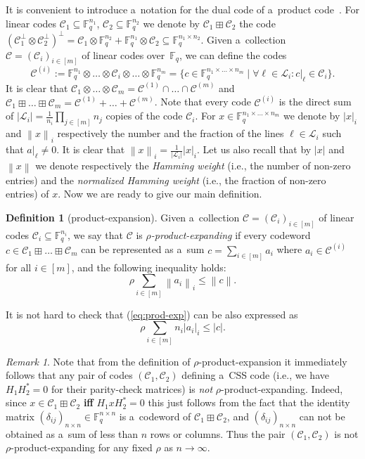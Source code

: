 \documentclass[11pt]{article}
\newcommand{\Iff}{\textbf{if\textcompwordmark f} }
\let\le\leqslant
\theoremstyle{plain}
\theoremstyle{definition}
\newtheorem*{definition}{Definition}
\theoremstyle{remark}
\newtheorem{remark}{Remark}
\newcommand{\abs}[1]{\left\lvert #1 \right\rvert}
\newcommand{\norm}[1]{\left\lVert#1\right\rVert}
\newcommand{\cC}{\mathcal{C}}
\newcommand{\cL}{\mathcal{L}}
\newcommand{\F}{\mathbb{F}}
\begin{document}
It is convenient to introduce a~notation for the dual code of a~product code~\cite{Wolf:1965, Chien:1973}. For linear codes $\cC_1\subseteq \F_q^{n_1}$, $\cC_2\subseteq \F_q^{n_2}$ we denote by $\cC_1\boxplus \cC_2$ the code $(\cC_1^\bot\otimes \cC_2^\bot)^\bot=\cC_1\otimes \F_q^{n_2}+\F_q^{n_1}\otimes \cC_2 \subseteq \F_q^{n_1\times n_2}$.
Given a~collection $\cC = (\cC_i)_{i\in [m]}$ of linear codes over~$\F_q$, we can define the codes 
\[
\cC^{(i)} := \F_q^{n_1} \otimes\dots\otimes \cC_i \otimes\dots\otimes \F_q^{n_m} = \{ c\in \F_q^{n_1\times\dots\times n_m} \mid \forall \ell\in \cL_i\colon c|_\ell\in  \cC_i \} .
\]
It is clear that $\cC_1\otimes \dots \otimes \cC_m = \cC^{(1)}\cap \dots \cap \cC^{(m)}$ and $\cC_1\boxplus \dots \boxplus \cC_m = \cC^{(1)}+ \dots + \cC^{(m)}$. Note that every code $\cC^{(i)}$ is the direct sum of $|\cL_i| = \frac{1}{n_i}\prod_{j\in [m]} n_j$ copies of the code $\cC_i$. For $x\in \F_q^{n_1\times\dots\times n_m}$ we denote by $|x|_i$ and $\norm{x}_i$ respectively the number and the fraction of the lines $\ell\in\cL_i$ such that $a|_\ell \ne 0$. It is clear that $\norm{x}_i = \frac{1}{|\cL_i|}|x|_i$. Let us also recall that by $|x|$ and $\norm{x}$ we denote respectively the \emph{Hamming weight} (i.e., the number of non-zero entries) and the \emph{normalized Hamming weight} (i.e., the fraction of non-zero entries) of $x$. Now we are ready to give our main definition. 



\begin{definition}[product-expansion]
Given a~collection $\cC = (\cC_i)_{i\in [m]}$ of linear codes $\cC_i\subseteq \F_q^{n_i}$, we say that $\cC$ is \emph{$\rho$-product-expanding} if every codeword $c\in \cC_1\boxplus \dots \boxplus \cC_m$ can be represented as a~sum $c = \sum_{i\in[m]} a_i$ where $a_i\in \cC^{(i)}$ for all $i\in [m]$, and the following inequality holds:
\begin{equation}\label{eq:prod-exp}
\rho\sum_{i\in [m]} \norm{a_i}_i \le \norm{c} .    
\end{equation}
\end{definition}

It is not hard to check that (\ref{eq:prod-exp}) can be also expressed as
\[ \rho\sum_{i\in [m]} n_i\abs{a_i}_i \le \abs{c}.\]

\begin{remark}\label{rm:exam-non-robust}
Note that from the definition of $\rho$-product-expansion it immediately follows that any pair of codes $(\cC_1, \cC_2)$ defining a~CSS code (i.e., we have $H_1 H_2^* = 0$ for their parity-check matrices) is \emph{not} $\rho$-product-expanding. Indeed, since $x\in \cC_1\boxplus \cC_2$ \Iff $H_1 x H_2^* = 0$ this just follows from the fact that the identity matrix $(\delta_{ij})_{n\times n}\in \F_q^{n\times n}$ is a~codeword of $\cC_1 \boxplus\cC_2$, and $(\delta_{ij})_{n\times n}$ can not be obtained as a~sum of less than $n$ rows or columns.  Thus the pair $(\cC_1, \cC_2)$ is not $\rho$-product-expanding for any fixed $\rho$ as $n\to\infty$.
\end{remark}
\end{document}
